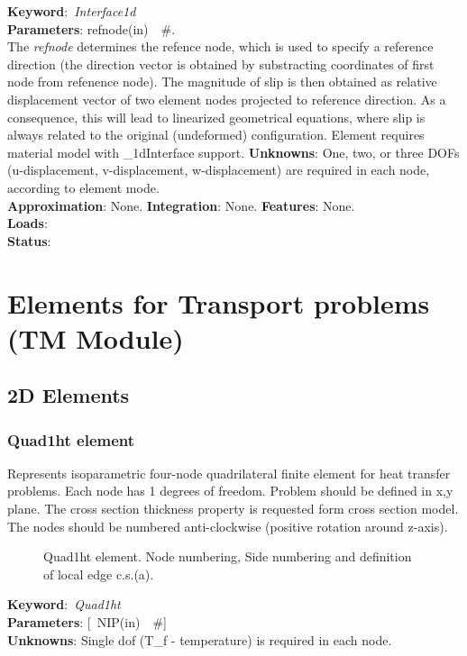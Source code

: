 \documentclass[12pt,dvips]{article}
\newcommand{\descitem}[1]{{\noindent \bf #1}:}
\newcommand{\elemkeyword}[1]{\descitem{Keyword}~{\em #1}}
\newcommand{\elemparam}[2]{{{#1\tiny (#2)}~~\#}}
\newcommand{\optelemparam}[2]{{[~\elemparam{#1}{#2}]}}
\newcommand{\param}[1]{{\it #1}}
\begin{document}
\elemkeyword{Interface1d}\\
\descitem{Parameters} \elemparam{refnode}{in}.\\
The \param{refnode} determines the refence node, which is used to
specify a reference direction (the direction vector is obtained by
substracting coordinates of first node from refenence node).
The magnitude of slip is then obtained as relative displacement vector
of two element nodes projected to reference direction. As a
consequence, this will lead to linearized geometrical equations, where
slip is always related to the original (undeformed) configuration.
Element requires material model with \_1dInterface support.
\descitem{Unknowns}
One, two, or three DOFs (u-displacement, v-displacement,
w-displacement) are required in each node, according to element mode.\\
\descitem{Approximation} None.
\descitem{Integration} None.
\descitem{Features} None.\\
\descitem{Loads} \\
\descitem{Status} 



\section{Elements for Transport problems (TM Module)}
\subsection{2D Elements}
\subsubsection{Quad1ht element}
\label{Quad1ht}
Represents isoparametric four-node quadrilateral finite element for
heat transfer problems. Each node has 1 degrees of freedom.
Problem should be defined in x,y plane. The cross section thickness
property is requested form cross section model.
The nodes should be numbered anti-clockwise (positive rotation around
z-axis). 

\begin{figure}[tb]
\begin{center}\end{center}
\caption{Quad1ht element. Node numbering, Side numbering and
definition of local edge c.s.(a).}
\label{Quad1htfig}
\end{figure}

\elemkeyword{Quad1ht}\\
\descitem{Parameters} \optelemparam{NIP}{in}\\
\descitem{Unknowns}
Single dof (T\_f - temperature) is required in each node.
\end{document}
